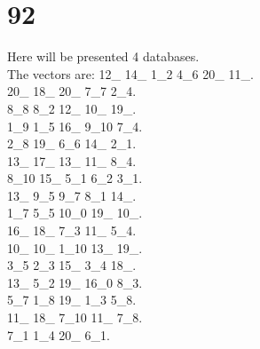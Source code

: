 \chapter{92}
\indent Here will be presented 4 databases.\\
The vectors are:
12\_ 14\_ 1\_2 4\_6 20\_ 11\_.\\20\_ 18\_ 20\_ 7\_7 2\_4.\\8\_8 8\_2 12\_ 10\_ 19\_.\\1\_9 1\_5 16\_ 9\_10 7\_4.\\2\_8 19\_ 6\_6 14\_ 2\_1.\\13\_ 17\_ 13\_ 11\_ 8\_4.\\8\_10 15\_ 5\_1 6\_2 3\_1.\\13\_ 9\_5 9\_7 8\_1 14\_.\\1\_7 5\_5 10\_0 19\_ 10\_.\\16\_ 18\_ 7\_3 11\_ 5\_4.\\10\_ 10\_ 1\_10 13\_ 19\_.\\3\_5 2\_3 15\_ 3\_4 18\_.\\13\_ 5\_2 19\_ 16\_0 8\_3.\\5\_7 1\_8 19\_ 1\_3 5\_8.\\11\_ 18\_ 7\_10 11\_ 7\_8.\\7\_1 1\_4 20\_ 6\_1.\\